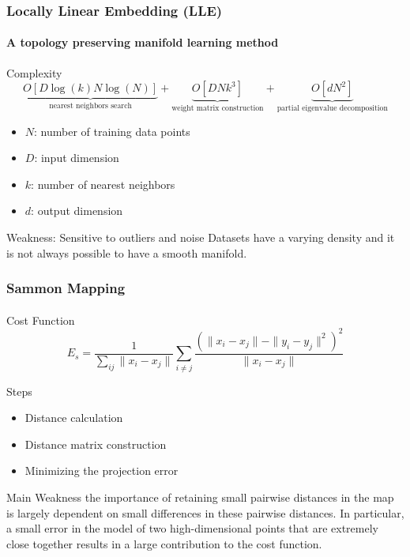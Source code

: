 \documentclass{beamer}
\begin{document}
\begin{frame}
  \frametitle{Locally Linear Embedding (LLE)}
  \framesubtitle{A topology preserving manifold learning method}
  
  \begin{block}{Complexity}
    \[
      \underbrace{O[D \log(k) N \log(N)]}_{\text{nearest neighbors search}}  + 
      \underbrace{O[D N k^3]}_{\text{weight matrix construction}} + 
      \underbrace{O[d N^2]}_{\text{partial eigenvalue decomposition}}
    \]
    \begin{itemize}
      \item $N$: number of training data points
      \item $D$: input dimension
      \item $k$: number of nearest neighbors
      \item $d$: output dimension
    \end{itemize}
  \end{block}

  
  \begin{block}{Weakness: Sensitive to outliers and noise}
    Datasets have a varying density and it is not always possible to have a smooth manifold.
  \end{block}
  
\end{frame}

% 
% 
% 
% 
% 
% 
\begin{frame}
  \frametitle{Sammon Mapping }
  \framesubtitle{}

  Cost Function
  \[
    E_s = \frac{1}{\sum_{ij}   \| x_i - x_j \|}
    \sum_{i \neq j} 
    \frac{(\| x_i - x_j \| - \|y_i - y_j\|^2)^2}{\| x_i - x_j \|}
  \]

  Steps
  \begin{itemize}
    \item Distance calculation
    \item Distance matrix construction
    \item Minimizing the projection error
  \end{itemize}

  \begin{block}{Main Weakness}
    the importance of retaining small pairwise
  distances in the map is largely dependent on small differences in these pairwise distances. 
  In particular, a small error in the model of two high-dimensional points that are extremely close together
  results in a large contribution to the cost function.
  \end{block}

\end{frame}
\end{document}
